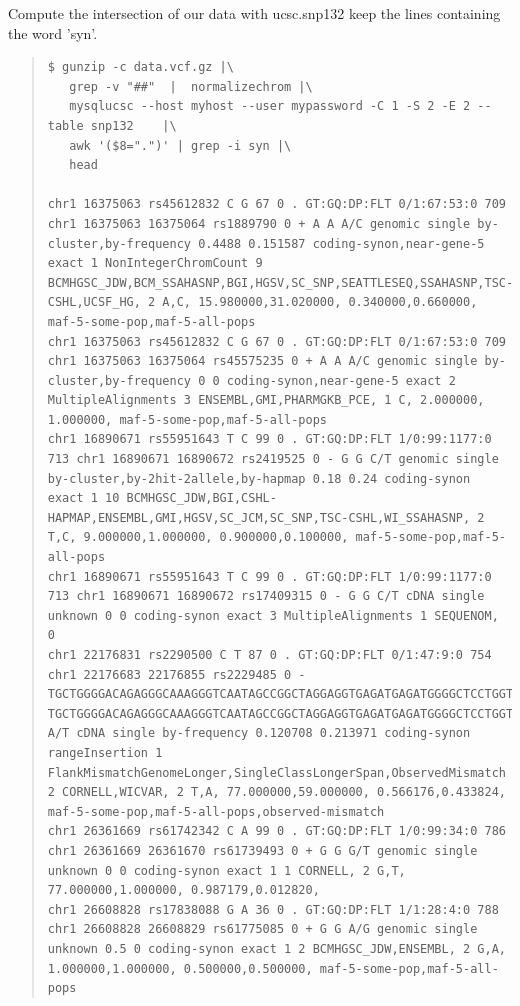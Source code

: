 \documentclass[12pt]{article}
\begin{document}
Compute the intersection of our data with ucsc.snp132 keep the lines containing the word 'syn'.
\begin{quote}
\begin{verbatim}
$ gunzip -c data.vcf.gz |\
   grep -v "##"  |  normalizechrom |\
   mysqlucsc --host myhost --user mypassword -C 1 -S 2 -E 2 --table snp132    |\
   awk '($8=".")' | grep -i syn |\
   head
   
chr1 16375063 rs45612832 C G 67 0 . GT:GQ:DP:FLT 0/1:67:53:0 709 chr1 16375063 16375064 rs1889790 0 + A A A/C genomic single by-cluster,by-frequency 0.4488 0.151587 coding-synon,near-gene-5 exact 1 NonIntegerChromCount 9 BCMHGSC_JDW,BCM_SSAHASNP,BGI,HGSV,SC_SNP,SEATTLESEQ,SSAHASNP,TSC-CSHL,UCSF_HG, 2 A,C, 15.980000,31.020000, 0.340000,0.660000, maf-5-some-pop,maf-5-all-pops
chr1 16375063 rs45612832 C G 67 0 . GT:GQ:DP:FLT 0/1:67:53:0 709 chr1 16375063 16375064 rs45575235 0 + A A A/C genomic single by-cluster,by-frequency 0 0 coding-synon,near-gene-5 exact 2 MultipleAlignments 3 ENSEMBL,GMI,PHARMGKB_PCE, 1 C, 2.000000, 1.000000, maf-5-some-pop,maf-5-all-pops
chr1 16890671 rs55951643 T C 99 0 . GT:GQ:DP:FLT 1/0:99:1177:0 713 chr1 16890671 16890672 rs2419525 0 - G G C/T genomic single by-cluster,by-2hit-2allele,by-hapmap 0.18 0.24 coding-synon exact 1 10 BCMHGSC_JDW,BGI,CSHL-HAPMAP,ENSEMBL,GMI,HGSV,SC_JCM,SC_SNP,TSC-CSHL,WI_SSAHASNP, 2 T,C, 9.000000,1.000000, 0.900000,0.100000, maf-5-some-pop,maf-5-all-pops
chr1 16890671 rs55951643 T C 99 0 . GT:GQ:DP:FLT 1/0:99:1177:0 713 chr1 16890671 16890672 rs17409315 0 - G G C/T cDNA single unknown 0 0 coding-synon exact 3 MultipleAlignments 1 SEQUENOM, 0
chr1 22176831 rs2290500 C T 87 0 . GT:GQ:DP:FLT 0/1:47:9:0 754 chr1 22176683 22176855 rs2229485 0 - TGCTGGGGACAGAGGGCAAAGGGTCAATAGCCGGCTAGGAGGTGAGATGAGATGGGGCTCCTGGTCTCAAGGCAGGTGCAGTCTGCGGCTTGGCCTCCTGATCCTGCCGTTGCAAGAGTGGGGGGCCTCCCACCCTGGGTCCCCAGCCCTGCCCTCCCTGAGAGCTACTCAC TGCTGGGGACAGAGGGCAAAGGGTCAATAGCCGGCTAGGAGGTGAGATGAGATGGGGCTCCTGGTCTCAAGGCAGGTGCAGTCTGCGGCTTGGCCTCCTGATCCTGCCGTTGCAAGAGTGGGGGGCCTCCCACCCTGGGTCCCCAGCCCTGCCCTCCCTGAGAGCTACTCAC A/T cDNA single by-frequency 0.120708 0.213971 coding-synon rangeInsertion 1 FlankMismatchGenomeLonger,SingleClassLongerSpan,ObservedMismatch 2 CORNELL,WICVAR, 2 T,A, 77.000000,59.000000, 0.566176,0.433824, maf-5-some-pop,maf-5-all-pops,observed-mismatch
chr1 26361669 rs61742342 C A 99 0 . GT:GQ:DP:FLT 1/0:99:34:0 786 chr1 26361669 26361670 rs61739493 0 + G G G/T genomic single unknown 0 0 coding-synon exact 1 1 CORNELL, 2 G,T, 77.000000,1.000000, 0.987179,0.012820,
chr1 26608828 rs17838088 G A 36 0 . GT:GQ:DP:FLT 1/1:28:4:0 788 chr1 26608828 26608829 rs61775085 0 + G G A/G genomic single unknown 0.5 0 coding-synon exact 1 2 BCMHGSC_JDW,ENSEMBL, 2 G,A, 1.000000,1.000000, 0.500000,0.500000, maf-5-some-pop,maf-5-all-pops

\end{verbatim}
\end{quote}
\end{document}

